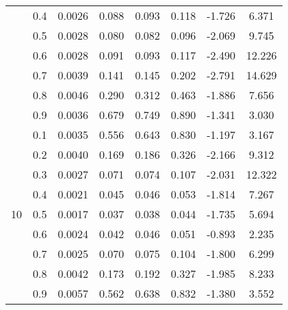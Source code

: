 \documentclass[11pt,a4paper]{report}
\begin{document}
\begin{longtable}{ | c | c || c | c | c | c | c | c | }
 & 0.4 & 0.0026 & 0.088 & 0.093 & 0.118 & -1.726 & 6.371 \\
 & 0.5 & 0.0028 & 0.080 & 0.082 & 0.096 & -2.069 & 9.745 \\
 & 0.6 & 0.0028 & 0.091 & 0.093 & 0.117 & -2.490 & 12.226 \\
 & 0.7 & 0.0039 & 0.141 & 0.145 & 0.202 & -2.791 & 14.629 \\
 & 0.8 & 0.0046 & 0.290 & 0.312 & 0.463 & -1.886 & 7.656 \\
 & 0.9 & 0.0036 & 0.679 & 0.749 & 0.890 & -1.341 & 3.030 \\
 \hline
\multirow{9}{*}{10} & 0.1 & 0.0035 & 0.556 & 0.643 & 0.830 & -1.197 & 3.167 \\
 & 0.2 & 0.0040 & 0.169 & 0.186 & 0.326 & -2.166 & 9.312 \\
 & 0.3 & 0.0027 & 0.071 & 0.074 & 0.107 & -2.031 & 12.322 \\
 & 0.4 & 0.0021 & 0.045 & 0.046 & 0.053 & -1.814 & 7.267 \\
 & 0.5 & 0.0017 & 0.037 & 0.038 & 0.044 & -1.735 & 5.694 \\
 & 0.6 & 0.0024 & 0.042 & 0.046 & 0.051 & -0.893 & 2.235 \\
 & 0.7 & 0.0025 & 0.070 & 0.075 & 0.104 & -1.800 & 6.299 \\
 & 0.8 & 0.0042 & 0.173 & 0.192 & 0.327 & -1.985 & 8.233 \\
 & 0.9 & 0.0057 & 0.562 & 0.638 & 0.832 & -1.380 & 3.552 \\
 \hline
\hline
\end{longtable}
\end{document}
